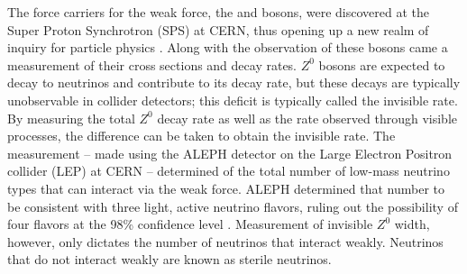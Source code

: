 The force carriers for the weak force, the \wb and \zb bosons, were
discovered at the Super Proton Synchrotron (SPS) at CERN, thus opening up a new
realm of inquiry for particle physics \cite{wBoson, zBoson}.  Along with the
observation of these bosons came a measurement of their cross sections and
decay rates.  $Z^0$ bosons are expected to decay to neutrinos and contribute to
its decay rate, but these decays are typically unobservable in collider
detectors; this deficit is typically called the invisible rate.  By measuring
the total $Z^0$ decay rate as well as the rate observed through visible
processes, the difference can be taken to obtain the invisible rate.  The
measurement -- made using the ALEPH detector on the Large Electron Positron
collider (LEP) at CERN -- determined of the total number of low-mass
neutrino types that can interact via the weak force.
ALEPH determined that number to
be consistent with three light, active neutrino flavors,
ruling out the possibility of four flavors
at the 98\% confidence level \cite{aleph}.
Measurement of
invisible $Z^0$ width, however, only dictates the number of neutrinos that
interact weakly.  Neutrinos that do not interact weakly are known as sterile
neutrinos.

